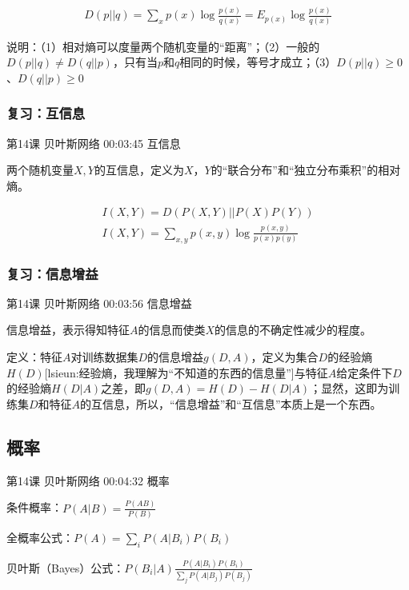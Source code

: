 \documentclass[UTF8]{ctexbook}
\begin{document}
\begin{equation}
\begin{aligned}
D(p||q)=\sum_{x}p(x)\log \frac{p(x)}{q(x)}=E_{p(x)}\log \frac{p(x)}{q(x)}
\end{aligned}
\end{equation}

说明：（1）相对熵可以度量两个随机变量的“距离”；（2）一般的$D(p||q) \neq D(q||p)$，只有当$p$和$q$相同的时候，等号才成立；（3）$D(p||q) \geq 0$、$D(q||p) \geq 0$

\subsubsection{复习：互信息}

第14课 贝叶斯网络 00:03:45 互信息

两个随机变量$X,Y$的互信息，定义为$X$，$Y$的“联合分布”和“独立分布乘积”的相对熵。

\begin{equation}
\begin{aligned}
I(X,Y)=D\left (P(X,Y) || P(X)P(Y) \right) \\
I(X,Y)=\sum_{x,y}p(x,y)\log \frac{p(x,y)}{p(x)p(y)}
\end{aligned}
\end{equation}

\subsubsection{复习：信息增益}

第14课 贝叶斯网络 00:03:56 信息增益

信息增益，表示得知特征$A$的信息而使类$X$的信息的不确定性减少的程度。

定义：特征$A$对训练数据集$D$的信息增益$g(D,A)$，定义为集合$D$的经验熵$H(D)$[lsieun:经验熵，我理解为“不知道的东西的信息量”]与特征$A$给定条件下$D$的经验熵$H(D|A)$之差，即$g(D,A)=H(D)-H(D|A)$；显然，这即为训练集$D$和特征$A$的互信息，所以，“信息增益”和“互信息”本质上是一个东西。

\subsection{概率}

第14课 贝叶斯网络 00:04:32 概率

条件概率：$P(A|B)=\frac{P(AB)}{P(B)}$

全概率公式：$P(A)=\sum_{i}P(A|B_{i})P(B_{i})$

贝叶斯（Bayes）公式：$P(B_{i}|A)\frac{P(A|B_{i})P(B_{i})}{\sum_{j}P(A|B_{j})P(B_{j})}$
\end{document}

